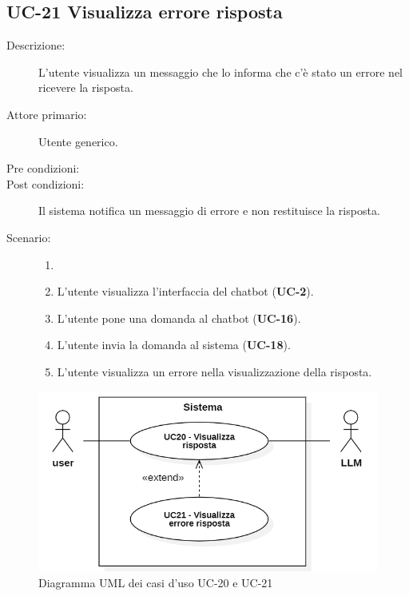 \subsection{UC-21 Visualizza errore risposta}
\begin{description}
    \item[Descrizione:] L'utente visualizza un messaggio che lo informa che c'è stato un errore nel ricevere la risposta.
    \item[Attore primario:] Utente generico.
    \item[Pre condizioni:] 
    \item[Post condizioni:] Il sistema notifica un messaggio di errore e non restituisce la risposta.
    \item[Scenario:] 
    \begin{enumerate}
        \item[] 
        \item L’utente visualizza l'interfaccia del chatbot (\textbf{UC-2}).
        \item L’utente pone una domanda al chatbot (\textbf{UC-16}).
        \item L'utente invia la domanda al sistema (\textbf{UC-18}).
        \item L'utente visualizza un errore nella visualizzazione della risposta.
    \end{enumerate}
\end{description}

\begin{figure}[H]
    \centering
    \includegraphics[width=0.8\linewidth]{UC20-21.PNG}
    \caption{Diagramma UML dei casi d'uso UC-20 e UC-21}
    \label{fig:UC20-21}
\end{figure}

